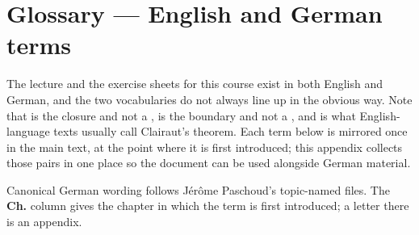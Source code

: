 %
%

\chapter{Glossary --- English and German terms}
\label{ch:glossary}

The lecture and the exercise sheets for this course exist in both English and German, and the
two vocabularies do not always line up in the obvious way. Note that  is
the closure and not a ,  is the boundary and not a , and
 is what English-language texts usually call Clairaut's theorem.
Each term below is mirrored once in the main text, at the point where it is first introduced;
this appendix collects those pairs in one place so the document can be used alongside German
material.

Canonical German wording follows Jérôme Paschoud's topic-named files. The \textbf{Ch.} column
gives the chapter in which the term is first introduced; a letter there is an appendix.

